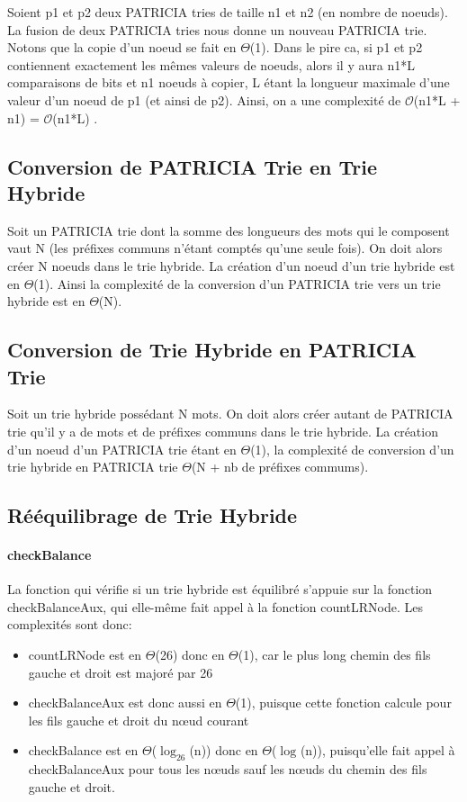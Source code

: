 \documentclass[a4paper,12pt]{report}
\begin{document}
Soient p1 et p2 deux PATRICIA tries de taille n1 et n2 (en nombre de noeuds).
La fusion de deux PATRICIA tries nous donne un nouveau PATRICIA trie. Notons que la copie d'un noeud se fait en $\Theta$(1).
Dans le pire ca, si p1 et p2 contiennent exactement les mêmes valeurs de noeuds, alors il y aura n1*L comparaisons de bits et n1 noeuds à copier, L étant la longueur maximale d'une valeur d'un noeud de p1 (et ainsi de p2). Ainsi, on a une complexité de $\mathcal{O}$(n1*L + n1) = $\mathcal{O}$(n1*L) .


\subsection{Conversion de PATRICIA Trie en Trie Hybride}
Soit un PATRICIA trie dont la somme des longueurs des mots qui le composent vaut N (les préfixes communs n'étant comptés qu'une seule fois). On doit alors créer N noeuds dans le trie hybride. La création d'un noeud d'un trie hybride est en $\Theta$(1).
Ainsi la complexité de la conversion d'un PATRICIA trie vers un trie hybride est en $\Theta$(N).

\subsection{Conversion de Trie Hybride en PATRICIA Trie}
Soit un trie hybride possédant N mots. On doit alors créer autant de PATRICIA trie qu'il y a de mots et de préfixes communs dans le trie hybride.
La création d'un noeud d'un PATRICIA trie étant en $\Theta$(1), la complexité de conversion d'un trie hybride en PATRICIA trie $\Theta$(N + nb de préfixes commums).

\subsection{Rééquilibrage de Trie Hybride}
\paragraph{checkBalance}
La fonction qui vérifie si un trie hybride est équilibré s'appuie sur la fonction checkBalanceAux, qui elle-même fait appel à la fonction countLRNode.
Les complexités sont donc:
\begin{itemize}
 \item countLRNode est en $\Theta$(26) donc en $\Theta$(1), car le plus long chemin des fils gauche et droit est majoré par 26
 \item checkBalanceAux est donc aussi en $\Theta$(1), puisque cette fonction calcule pour les fils gauche et droit du nœud courant
 \item checkBalance est en $\Theta$($\log_{26}$(n)) donc en $\Theta$($\log_{}$(n)), puisqu'elle fait appel à checkBalanceAux 
pour tous les nœuds sauf les nœuds du chemin des fils gauche et droit.
\end{itemize}
\end{document}
